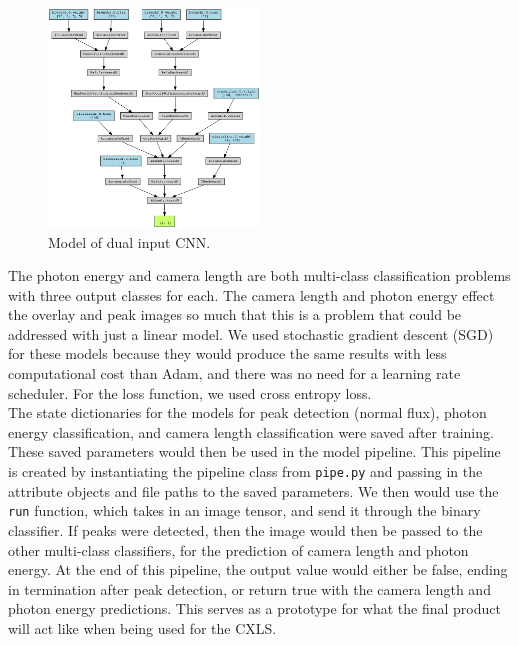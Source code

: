 \documentclass[12pt]{article}
\begin{document}
\begin{figure}[H]
    \centering
    \includegraphics[width=0.5\textwidth]{models/peak_detection_model.png.png}
    \caption{Model of dual input CNN.}
    \label{fig:dual_model}
\end{figure}

The photon energy and camera length are both multi-class classification problems with three output classes for each. The camera length and photon energy effect the overlay and peak images so much that this is a problem that could be addressed with just a linear model. We used stochastic gradient descent (SGD) for these models because they would produce the same results with less computational cost than Adam, and there was no need for a learning rate scheduler. For the loss function, we used cross entropy loss.\\

The state dictionaries for the models for peak detection (normal flux), photon energy classification, and camera length classification were saved after training. These saved parameters would then be used in the model pipeline. This pipeline is created by instantiating the pipeline class from \texttt{pipe.py} and passing in the attribute objects and file paths to the saved parameters. We then would use the \texttt{run} function, which takes in an image tensor, and send it through the binary classifier. If peaks were detected, then the image would then be passed to the other multi-class classifiers, for the prediction of camera length and photon energy. At the end of this pipeline, the output value would either be false, ending in termination after peak detection, or return true with the camera length and photon energy predictions. This serves as a prototype for what the final product will act like when being used for the CXLS.\\
\end{document}
